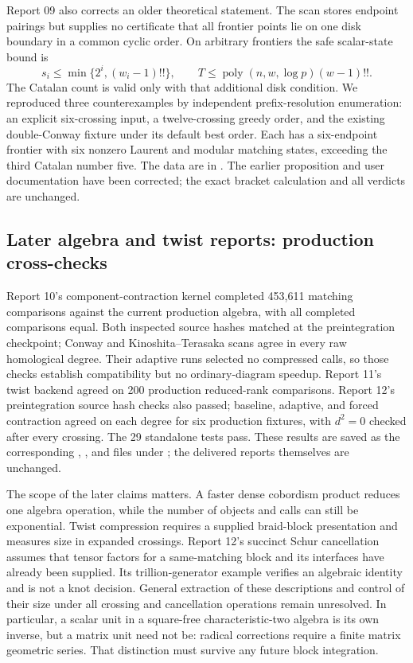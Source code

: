 Report 09 also corrects an older theoretical statement. The scan stores
endpoint pairings but supplies no certificate that all frontier points
lie on one disk boundary in a common cyclic order. On arbitrary frontiers
the safe scalar-state bound is
\[
 s_i\le\min\{2^i,(w_i-1)!!\},
 \qquad T\le\operatorname{poly}(n,w,\log p)(w-1)!!.
\]
The Catalan count is valid only with that additional disk condition.
We reproduced three counterexamples by independent prefix-resolution
enumeration: an explicit six-crossing input, a twelve-crossing greedy
order, and the existing double-Conway fixture under its default best
order. Each has a six-endpoint frontier with six nonzero Laurent and
modular matching states, exceeding the third Catalan number five.
The data are in .
The earlier proposition and user documentation have been corrected;
the exact bracket calculation and all verdicts are unchanged.

\subsection{Later algebra and twist reports: production cross-checks}
Report 10's component-contraction kernel completed 453,611 matching
comparisons against the current production algebra, with all completed
comparisons equal. Both inspected source hashes matched at the preintegration checkpoint; Conway and
Kinoshita--Terasaka scans agree in every raw homological degree. Their
adaptive runs selected no compressed calls, so those checks establish
compatibility but no ordinary-diagram speedup. Report 11's twist backend
agreed on 200 production reduced-rank comparisons. Report 12's preintegration source
hash checks also passed; baseline, adaptive, and forced contraction agreed
on each degree for six production fixtures, with $d^2=0$ checked after
every crossing. The 29 standalone tests pass. These results are saved
as the corresponding , , and
 files under
; the delivered reports themselves are unchanged.

The scope of the later claims matters. A faster dense cobordism product
reduces one algebra operation, while the number of objects and calls can
still be exponential. Twist compression requires a supplied braid-block
presentation and measures size in expanded crossings. Report 12's
succinct Schur cancellation assumes that tensor factors for a
same-matching block and its interfaces have already been supplied.
Its trillion-generator example verifies an algebraic identity and is
not a knot decision. General extraction of these descriptions and
control of their size under all crossing and cancellation operations
remain unresolved. In particular, a scalar unit in a square-free
characteristic-two algebra is its own inverse, but a matrix unit need
not be: radical corrections require a finite matrix geometric series.
That distinction must survive any future block integration.


